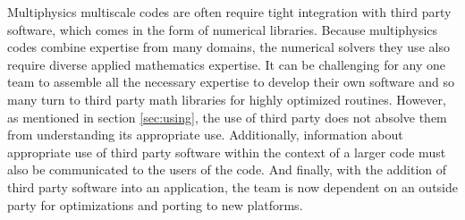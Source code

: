 Multiphysics multiscale codes are often require tight integration with third party software, which comes
in the form of numerical libraries. Because multiphysics codes combine
expertise from many domains, the numerical solvers they use also
require diverse applied mathematics expertise. It can be challenging 
for any one team to assemble all the necessary expertise to develop their own software and so many turn to third party math libraries for highly optimized routines.  However, as mentioned in section \ref{sec:using}, the use of
third party does not absolve them from understanding its appropriate
use.  Additionally, information about appropriate use of third party
software within the context of a larger code must also be communicated
to the users of the code.  And finally, with the addition of third party software into an application, the team is now dependent on an outside party for optimizations and porting to new platforms.




